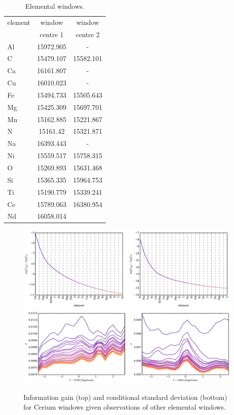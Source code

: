 \documentclass[a4paper,fleqn,usenatbib]{mnras}
\begin{document}
\begin{table}
    \centering
    \caption{Elemental windows.}
    \label{tab:window_centres}
    \begin{tabular}{lcc}
        \hline
        element & window & window \\
         & centre 1 & centre 2 \\
        \hline
        Al & 15972.905 & - \\
        C & 15479.107 & 15582.101 \\
        Ca & 16161.807 & - \\
        Cu & 16010.023 & - \\
        Fe & 15494.733 & 15505.643 \\
        Mg & 15425.309 & 15697.701 \\
        Mn & 15162.885 & 15221.867 \\
        N & 15161.42 & 15321.871 \\
        Na & 16393.443 & - \\
        Ni & 15559.517 & 15758.315 \\
        O & 15269.893 & 15631.468 \\
        Si & 15365.335 & 15964.753 \\
        Ti & 15190.779 & 15339.241 \\
        Ce & 15789.063 & 16380.954 \\
        Nd & 16058.014 & \\
        \hline
    \end{tabular}
\end{table}

\begin{figure}
	\includegraphics[width=2\columnwidth]{apogee_centers_subset2_ce_nd_29502_spc_ce_inf_gain.pdf}
	\includegraphics[width=2\columnwidth]{apogee_centers_subset2_ce_nd_29502_spc_ce_conditional_stddevs.pdf}
    \caption{Information gain (top) and conditional standard deviation (bottom) for Cerium windows given observations of other elemental windows.}
    \label{fig:ce_information}
\end{figure}
\end{document}
